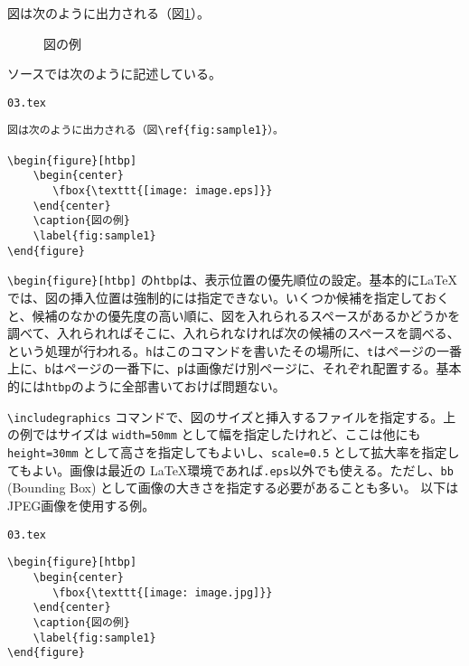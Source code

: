 図は次のように出力される（図\ref{fig:sample1}）。

\begin{figure}[htbp]
    \begin{center}
    \end{center}
    \caption{図の例}
    \label{fig:sample1}
\end{figure}

ソースでは次のように記述している。

\begin{itembox}[l]{{\tt 03.tex}}
\begin{verbatim}
図は次のように出力される（図\ref{fig:sample1}）。

\begin{figure}[htbp]
    \begin{center}
       \fbox{\texttt{[image: image.eps]}}
    \end{center}
    \caption{図の例}
    \label{fig:sample1}
\end{figure}
\end{verbatim}
\end{itembox}

\verb|\begin{figure}[htbp]|  の{\tt htbp}は、表示位置の優先順位の設定。基本的に\LaTeX では、図の挿入位置は強制的には指定できない。いくつか候補を指定しておくと、候補のなかの優先度の高い順に、図を入れられるスペースがあるかどうかを調べて、入れられればそこに、入れられなければ次の候補のスペースを調べる、という処理が行われる。{\tt h}はこのコマンドを書いたその場所に、{\tt t}はページの一番上に、{\tt b}はページの一番下に、{\tt p}は画像だけ別ページに、それぞれ配置する。基本的には{\tt htbp}のように全部書いておけば問題ない。

\verb|\includegraphics| コマンドで、図のサイズと挿入するファイルを指定する。上の例ではサイズは {\tt width=50mm} として幅を指定したけれど、ここは他にも {\tt height=30mm} として高さを指定してもよいし、{\tt scale=0.5} として拡大率を指定してもよい。画像は最近の \LaTeX 環境であれば{\tt *.eps}以外でも使える。ただし、{\tt bb} (Bounding Box) として画像の大きさを指定する必要があることも多い。
以下はJPEG画像を使用する例。

\begin{itembox}[l]{{\tt 03.tex}}
\begin{verbatim}
\begin{figure}[htbp]
    \begin{center}
       \fbox{\texttt{[image: image.jpg]}}
    \end{center}
    \caption{図の例}
    \label{fig:sample1}
\end{figure}
\end{verbatim}
\end{itembox}

